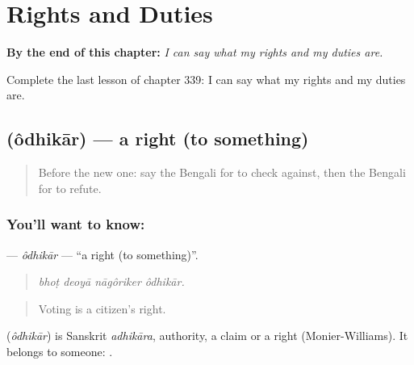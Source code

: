 
\chapter{Rights and Duties}
\label{ch:bn-rights-and-duties}

\begin{chapteropening}
\textbf{By the end of this chapter:} \emph{I can say what my rights and my duties are.}

Complete the last lesson of chapter 339: I can say what my rights and my duties are.
\end{chapteropening}

\section[\texorpdfstring{\bn{অধিকার} (ôdhikār)}{অধিকার (ôdhikār)}]{ (ôdhikār) — a right (to something)}

\label{lesson:BN-C339-odhikar}



\begin{quote}
Before the new one: say the Bengali for to check against, then the Bengali for to refute.
\end{quote}

\subsection*{You'll want to know: }
\textbf{} — \emph{ôdhikār} — \textquotedblleft{}a right (to something)\textquotedblright{}.

\begin{quote}
   
\end{quote}

\begin{quote}
\emph{bhoṭ deoyā nāgôriker ôdhikār.}
\end{quote}

\begin{quote}
Voting is a citizen's right.
\end{quote}

\begin{cousinweb}
\textbf{} (\emph{ôdhikār}) is Sanskrit \emph{adhikāra}, authority, a claim or a right (Monier-Williams). It belongs to someone:  .
\end{cousinweb}

